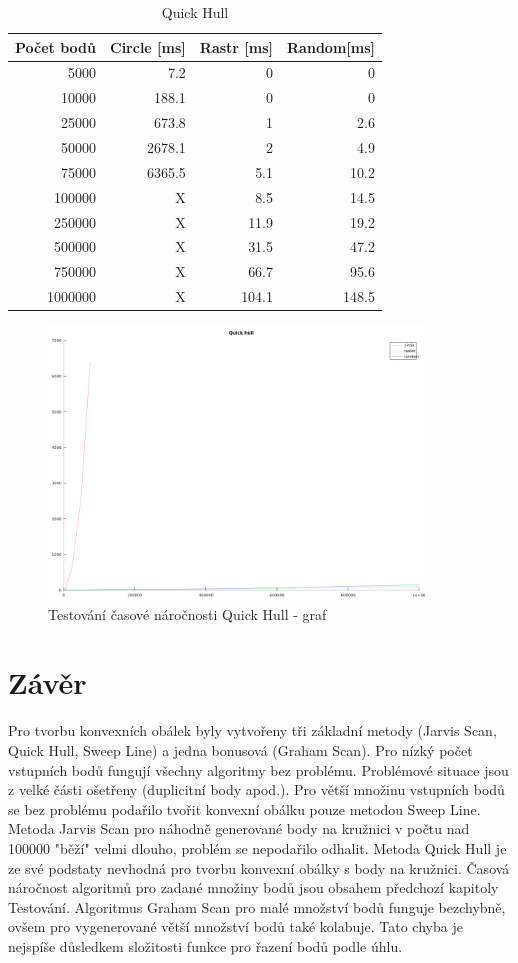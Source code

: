 \documentclass[a4paper, 12pt]{article}
\begin{document}
\begin{table}[h!]
	\centering
	\begin{tabular}{|r|r|r|r|}
	\hline
	 \textbf{Počet bodů} 	& \textbf{Circle [ms]} & \textbf{Rastr [ms]}  & \textbf{Random[ms]} \\ \hline
	 5000 & 7.2 & 0 & 0   \\ \hline
	10000 & 188.1 & 0 & 0   \\ \hline
	25000 & 673.8 & 1 & 2.6  \\ \hline
	50000 & 2678.1 & 2 & 4.9   \\ \hline
	75000 & 6365.5 & 5.1 & 10.2  \\ \hline
	100000 & X & 8.5 & 14.5  \\ \hline
	250000 & X & 11.9 & 19.2   \\ \hline
	500000 & X & 31.5 & 47.2  \\ \hline
	750000 & X & 66.7 & 95.6  \\ \hline
	1000000 & X & 104.1 & 148.5 \\ \hline
	
	\end{tabular}
		\caption{Quick Hull}
\end{table}

\begin{figure}[h!]
	\centering
	\includegraphics[width=10cm]{figure_quick_hull.png}
	\caption{Testování časové náročnosti Quick Hull - graf}
\end{figure}

\clearpage
\section{Závěr}
Pro tvorbu konvexních obálek byly vytvořeny tři základní metody (Jarvis Scan, Quick Hull, Sweep Line) a jedna bonusová (Graham Scan). Pro nízký počet vstupních bodů fungují všechny algoritmy bez problému. Problémové situace jsou z velké části ošetřeny (duplicitní body apod.). Pro větší množinu vstupních bodů se bez problému podařilo tvořit konvexní obálku pouze metodou Sweep Line. Metoda Jarvis Scan pro náhodně generované body na kružnici v počtu nad 100000 "běží" velmi dlouho, problém se nepodařilo odhalit. Metoda Quick Hull je ze své podstaty nevhodná pro tvorbu konvexní obálky s body na kružnici. Časová náročnost algoritmů pro zadané množiny bodů jsou obsahem předchozí kapitoly Testování. Algoritmus Graham Scan pro malé množství bodů funguje bezchybně, ovšem pro vygenerované větší množství bodů také kolabuje. Tato chyba je nejspíše důsledkem složitosti funkce pro řazení bodů podle úhlu.
\end{document}
